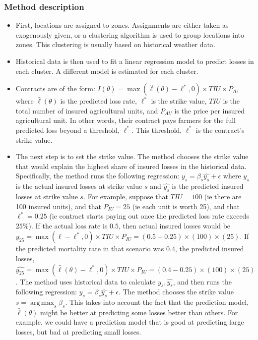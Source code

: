 \documentclass[11pt]{article}
\DeclareMathOperator*{\argmax}{arg\,max}
\begin{document}
    \subsubsection{Method description}
    \begin{itemize}
      \item First, locations are assigned to zones. Assignments are either taken as exogenously given, or a clustering algorithm is used to group locations into zones. This clustering is usually based on historical weather data.  
      \item Historical data is then used to fit a linear regression model to predict losses in each cluster. A different model is estimated for each cluster. 
      \item Contracts are of the form: $I(\theta) = \max(\hat{\ell}(\theta)-\ell^*,0)\times TIU \times P_{IU}$ where $\hat{\ell}(\theta)$ is the predicted loss rate, $\ell^*$ is the strike value, $TIU$ is the total number of insured agricultural units, and $P_{AU}$ is the price per insured agricultural unit.  In other words, their contract pays farmers for the full predicted loss beyond a threshold, $\ell^*$. This threshold, $\ell^*$ is the contract's strike value. 
      \item The next step is to set the strike value. The method chooses the strike value that would explain the highest share of insured losses in the historical data. Specifically, the method runs the following regression: $y_s = \beta_s \hat{y_s}+\epsilon$ where $y_s$ is the actual insured losses at strike value $s$ and $\hat{y_s}$ is the predicted insured losses at strike value $s$. For example, suppose that $TIU=100$ (ie there are 100 insured units), and that $P_{IU}=25$ (ie each unit is worth 25), and that $\ell^* = 0.25$ (ie contract starts paying out once the predicted loss rate exceeds $25\%$). If the actual loss rate is $0.5$, then actual insured losses would be $y_{25} = \max(\ell-\ell^*,0)\times TIU \times P_{IU} = (0.5-0.25)\times(100) \times (25)$. If the predicted mortality rate in that scenario was $0.4$, the predicted insured losses, $\hat{y_{25}} = \max(\hat{\ell}(\theta)-\ell^*,0)\times TIU \times P_{IU} = (0.4-0.25)\times(100) \times (25)$. The method uses historical data to calculate $y_s, \hat{y_s}$, and then runs the following regression: $y_s = \beta_s \hat{y_s}+\epsilon$. The method chooses the strike value $s= \argmax_s \beta_s$. This takes into account the fact that the prediction model, $\hat{\ell}(\theta)$ might be better at predicting some losses better than others. For example, we could have a prediction model that is good at predicting large losses, but bad at predicting small losses. 
  \end{itemize}
\end{document}
